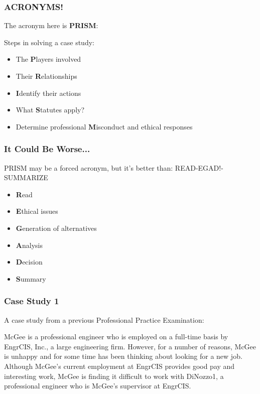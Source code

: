\begin{frame}
\frametitle{ACRONYMS!}

The acronym here is \textbf{PRISM}:

Steps in solving a case study:
\begin{itemize}
	\item The \textbf{P}layers involved
	\item Their \textbf{R}elationships
	\item \textbf{I}dentify their actions
	\item What \textbf{S}tatutes apply?
	\item Determine professional \textbf{M}isconduct and ethical responses
\end{itemize}

\end{frame}



\begin{frame}
\frametitle{It Could Be Worse...}

PRISM may be a forced acronym, but it's better than:
READ-EGAD!-SUMMARIZE

\begin{itemize}
	\item \textbf{R}ead
	\item \textbf{E}thical issues
	\item \textbf{G}eneration of alternatives
	\item \textbf{A}nalysis
	\item \textbf{D}ecision
	\item \textbf{S}ummary
\end{itemize}

\end{frame}



\begin{frame}
\frametitle{Case Study 1}

A case study from a previous Professional Practice Examination:


	McGee is a professional engineer who is employed on a full-time basis by  EngrCIS, Inc., a large engineering firm.  However, for a number of reasons, McGee is unhappy and for some time has been thinking about looking for a new job.  Although McGee's current employment at EngrCIS provides good pay and interesting work, McGee is finding it difficult to work with DiNozzo1, a professional engineer who is McGee's supervisor at EngrCIS.
\end{frame}



